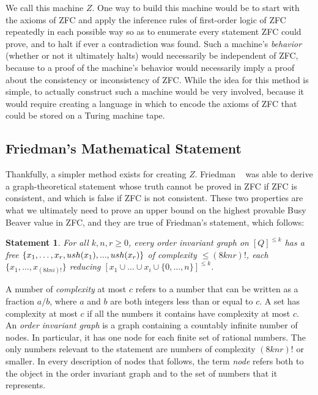\documentclass[11pt]{article}
\newtheorem{statement}{Statement}
\begin{document}
We call this machine $Z$. One way to build this machine would be to start with the axioms of ZFC and apply the inference rules of first-order logic of ZFC repeatedly in each possible way so as to enumerate every statement ZFC could prove, and to halt if ever a contradiction was found. Such a machine's \emph{behavior} (whether or not it ultimately halts) would necessarily be independent of ZFC, because to a proof of the machine's behavior would necessarily imply a proof about the consistency or inconsistency of ZFC. While the idea for this method is simple, to actually construct such a machine would be very involved, because it would require creating a language in which to encode the axioms of ZFC that could be stored on a Turing machine tape. \\

\subsection{Friedman's Mathematical Statement}

Thankfully, a simpler method exists for creating $Z$. Friedman \cite{friedman}~
was able to derive a graph-theoretical statement whose truth cannot be proved in ZFC if ZFC is consistent, and which is false if ZFC is not consistent. These two properties are what we ultimately need to prove an upper bound on the highest provable Busy Beaver value in ZFC, and they are true of Friedman's statement, which follows: \\

\begin{statement} \label{eq:friedman}
For all $k, n, r \ge 0$, every order invariant graph on $[Q]^{\le k}$ has a free $\{x_1,\dots,x_r, \\
ush(x_1),...,ush(x_r)\}$ of complexity $\le (8knr)!$, each $\{x_1, \dots, x_{(8kni)!}\}$
reducing $[x_1 \cup \dots \cup x_i \cup \{0,\dots,n\}]^{\le k}$. \cite{friedman}
\end{statement}

A number of \emph{complexity} at most $c$ refers to a number that can be written as a fraction $a/b$, where $a$ and $b$ are both integers less than or equal to $c$. A set has complexity at most $c$ if all the numbers it contains have complexity at most $c$. \\ 

An \emph{order invariant graph} is a graph containing a countably infinite number of nodes. In particular, it has one node for each finite set of rational numbers. The only numbers relevant to the statement are numbers of complexity $(8knr)!$ or smaller. In every description of nodes that follows, the term \emph{node} refers both to the object in the order invariant graph and to the set of numbers that it represents. \\
\end{document}
